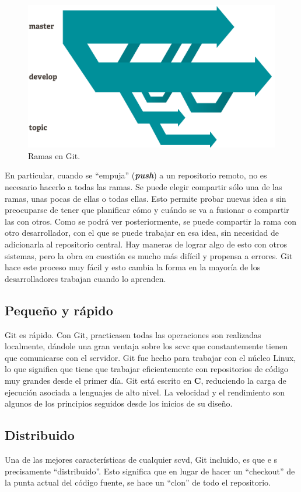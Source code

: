 \documentclass[12pt, spanish, oneside, onecolumn, a4paper]{report}
\begin{document}
\begin{figure}     %
  \begin{center} 
    \includegraphics[width=.6\textwidth,keepaspectratio=true]{branches.png} %
  \end{center} 
  \caption{Ramas en Git.} 
  \label{otrosvcs} 
\end{figure} En particular, cuando se ``empuja'' (\emph{\textbf{push}}) a un repositorio remoto, no es necesario hacerlo a todas las ramas. Se puede elegir compartir sólo una de las ramas, unas pocas de ellas o todas ellas. Esto permite probar nuevas idea s sin preocuparse de tener que planificar cómo y cuándo se va a fusionar o compartir las con otros. Como se podrá ver posteriormente, se puede compartir la rama con otro desarrollador, con el que se puede trabajar en esa idea, sin necesidad de adicionarla al repositorio central. Hay maneras de lograr algo de esto con otros sistemas, pero la obra en cuestión es mucho más difícil y propensa a errores. Git hace este proceso muy fácil y esto cambia la forma en la mayoría de los desarrolladores trabajan cuando lo aprenden. 

\subsection{Pequeño y rápido} 
\label{sec:smallandfast} Git es rápido. Con Git, practicasen todas las operaciones son realizadas localmente, dándole una gran ventaja sobre los \gls{scvc} que constantemente tienen que comunicarse con el servidor. Git fue hecho para trabajar con el núcleo Linux, lo que significa que tiene que trabajar eficientemente con repositorios de código muy grandes desde el primer día. Git está escrito en \textbf{C}, reduciendo la carga de ejecución asociada a lenguajes de alto nivel. La velocidad y el rendimiento son algunos de los principios seguidos desde los inicios de su diseño. 

\subsection{Distribuido} 
\label{sec:distributed} Una de las mejores características de cualquier 
\gls{scvd}, Git incluido, es que e s precisamente ``distribuido''. Esto significa que en lugar de hacer un ``checkout'' de la punta actual del código fuente, se hace un ``clon'' de todo el repositorio. 
\end{document}
